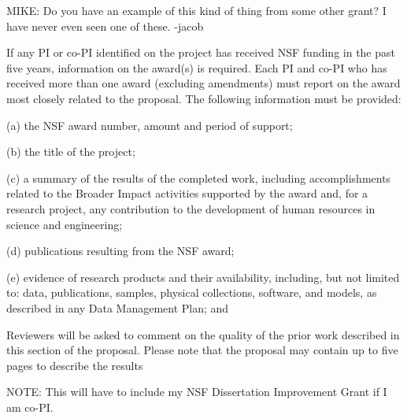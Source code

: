 \documentclass[pdftex,12pt,fullpage,oneside]{amsart}
\begin{document}
MIKE: Do you have an example of this kind of thing from some other
grant?  I have never even seen one of these.  -jacob

If any PI or co-PI identified on the project has received NSF funding in the past five years, information on the 
award(s) is required.  Each PI and co-PI who has received more than one award (excluding amendments) must 
report on the award most closely related to the proposal.  The following information must be provided:  

(a) the NSF award number, amount and period of support;  

(b) the title of the project; 

(c) a summary of the results of the completed work, including accomplishments related to the Broader 
Impact activities supported by the award and, for a research project, any contribution to the development 
of human resources in science and engineering;  

(d) publications resulting from the NSF award;  

(e) evidence of research products and their availability, including, but not limited to: data, publications, 
samples, physical collections, software, and models, as described in
any Data Management Plan; and 

Reviewers will be asked to comment on the quality of the prior work described in this section of the proposal.  
Please note that the proposal may contain up to five pages to describe the results

NOTE: This will have to include my NSF Dissertation Improvement Grant
if I am co-PI.



\newpage
\setcounter{page}{1}

 




\end{document}

